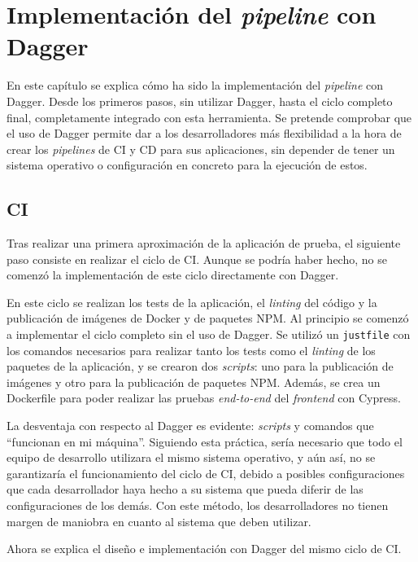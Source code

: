 \chapter{Implementación del \textit{pipeline} con Dagger}
\label{chap:dagger}

En este capítulo se explica cómo ha sido la implementación del \textit{pipeline} con Dagger. Desde los primeros pasos, sin utilizar Dagger, hasta el ciclo completo final, completamente integrado con esta herramienta. Se pretende comprobar que el uso de Dagger permite dar a los desarrolladores más flexibilidad a la hora de crear los \textit{pipelines} de CI y CD para sus aplicaciones, sin depender de tener un sistema operativo o configuración en concreto para la ejecución de estos.

\section{CI}
\label{sec:dagger-ci}

Tras realizar una primera aproximación de la aplicación de prueba, el siguiente paso consiste en realizar el ciclo de CI. Aunque se podría haber hecho, no se comenzó la implementación de este ciclo directamente con Dagger.

En este ciclo se realizan los tests de la aplicación, el \textit{linting} del código y la publicación de imágenes de Docker y de paquetes NPM. Al principio se comenzó a implementar el ciclo completo sin el uso de Dagger. Se utilizó un \texttt{justfile} con los comandos necesarios para realizar tanto los tests como el \textit{linting} de los paquetes de la aplicación, y se crearon dos \textit{scripts}: uno para la publicación de imágenes y otro para la publicación de paquetes NPM. Además, se crea un Dockerfile para poder realizar las pruebas \textit{end-to-end} del \textit{frontend} con Cypress\cite{cypress}.

La desventaja con respecto al Dagger es evidente: \textit{scripts} y comandos que ``funcionan en mi máquina''. Siguiendo esta práctica, sería necesario que todo el equipo de desarrollo utilizara el mismo sistema operativo, y aún así, no se garantizaría el funcionamiento del ciclo de CI, debido a posibles configuraciones que cada desarrollador haya hecho a su sistema que pueda diferir de las configuraciones de los demás. Con este método, los desarrolladores no tienen margen de maniobra en cuanto al sistema que deben utilizar.

Ahora se explica el diseño e implementación con Dagger del mismo ciclo de CI.

